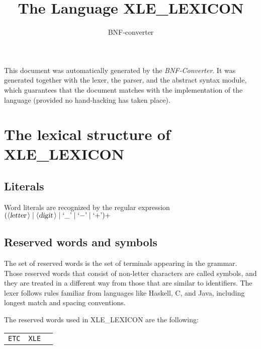 \documentclass[a4paper,11pt]{article}
\author{BNF-converter}
\title{The Language XLE_LEXICON}
\begin{document}
\maketitle

\newcommand{\emptyP}{\mbox{$\epsilon$}}
\newcommand{\terminal}[1]{\mbox{{\texttt {#1}}}}
\newcommand{\nonterminal}[1]{\mbox{$\langle \mbox{{\sl #1 }} \! \rangle$}}
\newcommand{\arrow}{\mbox{::=}}
\newcommand{\delimit}{\mbox{$|$}}
\newcommand{\reserved}[1]{\mbox{{\texttt {#1}}}}
\newcommand{\literal}[1]{\mbox{{\texttt {#1}}}}
\newcommand{\symb}[1]{\mbox{{\texttt {#1}}}}

This document was automatically generated by the {\em BNF-Converter}. It was generated together with the lexer, the parser, and the abstract syntax module, which guarantees that the document matches with the implementation of the language (provided no hand-hacking has taken place).

\section*{The lexical structure of XLE_LEXICON}

\subsection*{Literals}


Word literals are recognized by the regular expression
\(({\nonterminal{letter}} \mid {\nonterminal{digit}} \mid \mbox{`\_'} \mid \mbox{`{$-$}'} \mid \mbox{`{$+$}'})+\)


\subsection*{Reserved words and symbols}
The set of reserved words is the set of terminals appearing in the grammar. Those reserved words that consist of non-letter characters are called symbols, and they are treated in a different way from those that are similar to identifiers. The lexer follows rules familiar from languages like Haskell, C, and Java, including longest match and spacing conventions.

The reserved words used in XLE_LEXICON are the following: \\

\begin{tabular}{lll}
{\reserved{ETC}} &{\reserved{XLE}} & \\
\end{tabular}\\
\end{document}

